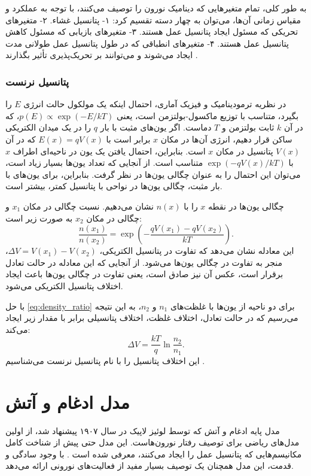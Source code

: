 به طور کلی، تمام متغیرهایی که دینامیک نورون را توصیف می‌کنند، با توجه به عملکرد و مقیاس زمانی آن‌ها، می‌توان به چهار دسته تقسیم کرد:
۱- پتانسیل غشاء.
۲- متغیرهای تحریکی که مسئول ایجاد پتانسیل عمل هستند.
۳- متغیرهای بازیابی که مسئول کاهش پتانسیل عمل هستند.
۴- متغیرهای انطباقی که در طول پتانسیل عمل طولانی مدت ایجاد می‌شوند و می‌توانند بر تحریک‌پذیری تأثیر بگذارند
\cite{izhikevich2006}.

\subsubsection{پتانسیل نرنست}
در نظریه ترمودینامیک و فیزیک آماری، احتمال اینکه یک مولکول حالت انرژی
\( E \)
را بگیرد، متناسب با توزیع ماکسول-بولتزمن است، یعنی
\( p(E) \propto \exp \left( -E / kT \right) \)،
که در آن
\( k \)
ثابت بولتزمن و
\( T \)
دماست.
اگر یون‌های مثبت با بار
\( q \)
را در یک میدان الکتریکی ساکن قرار دهیم، انرژی آن‌ها در مکان
\( x \)
برابر است با
\( E(x) = q V(x) \)
که در آن
\( V(x) \)
پتانسیل در مکان
\( x \)
است.
بنابراین، احتمال یافتن یک یون در ناحیه‌ای اطراف
\( x \)
با
\( \exp \left( -q V(x) / kT \right) \)
متناسب است.
از آنجایی که تعداد یون‌ها بسیار زیاد است، می‌توان این احتمال را به عنوان چگالی یون‌ها در نظر گرفت.
بنابراین، برای یون‌های با بار مثبت، چگالی یون‌ها در نواحی با پتانسیل کمتر، بیشتر است.

چگالی یون‌ها در نقطه
\( x \)
را با
\( n(x) \)
نشان می‌دهیم.
نسبت چگالی در مکان
\( x_1 \)
و چگالی در مکان
\( x_2 \)
به صورت زیر است:
\begin{equation} \label{eq:density_ratio}
    \frac{n(x_1)}{n(x_2)} = \exp \left( -\frac{q V(x_1) - q V(x_2)}{kT} \right).
\end{equation}
این معادله نشان می‌دهد که تفاوت در پتانسیل الکتریکی،
\( \Delta V = V(x_1) - V(x_2) \)،
منجر به تفاوت در چگالی یون‌ها می‌شود.
از آنجایی که این معادله در حالت تعادل برقرار است، عکس آن نیز صادق است، یعنی تفاوت در چگالی یون‌ها باعث ایجاد اختلاف پتانسیل الکتریکی می‌شود.

با حل
\autoref{eq:density_ratio}
برای دو ناحیه از یون‌ها با غلظت‌های
\( n_1 \) و \( n_2 \)،
به این نتیجه می‌رسیم که در حالت تعادل، اختلاف غلظت، اختلاف پتانسیلی برابر با مقدار زیر ایجاد می‌کند:
\begin{equation}
    \Delta V = \frac{kT}{q} \ln \frac{n_2}{n_1}.
\end{equation}
این اختلاف پتانسیل را با نام پتانسیل نرنست می‌شناسیم
\cite{hille2001}.

\section{مدل ادغام و آتش}
مدل پایه ادغام و آتش که توسط لوئیز لاپیک در سال ۱۹۰۷ پیشنهاد شد، از اولین مدل‌های ریاضی برای توصیف رفتار نورون‌هاست.
این مدل حتی پیش از شناخت کامل مکانیسم‌هایی که پتانسیل عمل را ایجاد می‌کنند، معرفی شده است
\cite{burkitt2006,brunel2007}.
با وجود سادگی و قدمت، این مدل همچنان یک توصیف بسیار مفید از فعالیت‌های نورونی ارائه می‌دهد.

